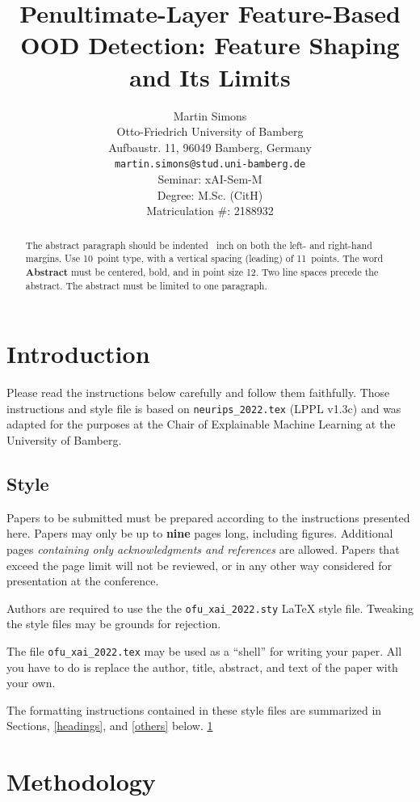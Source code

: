 \documentclass[a4paper]{article}
\title{Penultimate-Layer Feature-Based OOD Detection: Feature Shaping and Its Limits}
\author{%
  Martin Simons\\
  Otto-Friedrich University of Bamberg\\
  Aufbaustr. 11, 96049 Bamberg, Germany\\
  \texttt{martin.simons@stud.uni-bamberg.de} \\[0.5cm]
  Seminar: xAI-Sem-M \\
  Degree: M.Sc. (CitH) \\
  Matriculation \#: 2188932
}
\begin{document}
\maketitle
\def\va{{\bm{a}}}

\begin{abstract}
  The abstract paragraph should be indented ~inch on
  both the left- and right-hand margins. Use 10~point type, with a vertical
  spacing (leading) of 11~points.  The word \textbf{Abstract} must be centered,
  bold, and in point size 12. Two line spaces precede the abstract. The abstract
  must be limited to one paragraph.
\end{abstract}


\section{Introduction}
\label{intro}

Please read the instructions below carefully and follow them faithfully. Those instructions and style file is based on \verb+neurips_2022.tex+ (LPPL v1.3c) and was adapted for the purposes at the Chair of Explainable Machine Learning at the University of Bamberg.


\subsection{Style}


Papers to be submitted must be prepared according to the
instructions presented here. Papers may only be up to {\bf nine} pages long,
including figures. Additional pages \emph{containing only acknowledgments and
references} are allowed. Papers that exceed the page limit will not be
reviewed, or in any other way considered for presentation at the conference.


Authors are required to use the the \verb+ofu_xai_2022.sty+ \LaTeX{} style file. Tweaking the style files may be grounds for rejection.

The file \verb+ofu_xai_2022.tex+ may be used as a ``shell'' for writing your
paper. All you have to do is replace the author, title, abstract, and text of
the paper with your own.


The formatting instructions contained in these style files are summarized in
Sections, \ref{headings}, and \ref{others} below. \ref{intro}


\section{Methodology}
\label{meth}
\end{document}
